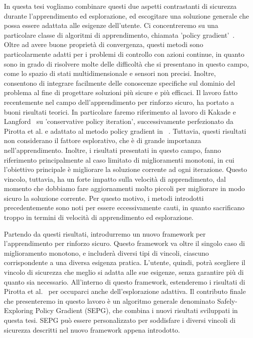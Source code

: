 In questa tesi vogliamo combinare questi due aspetti contrastanti di sicurezza durante l'apprendimento ed esplorazione, ed escogitare una soluzione generale che possa essere adattata alle esigenze dell'utente. Ci concentreremo su una particolare classe di algoritmi di apprendimento, chiamata 'policy gradient'~\cite{peters}. Oltre ad avere buone proprietà di convergenza, questi metodi sono particolarmente adatti per i problemi di controllo con azioni continue, in quanto sono in grado di risolvere molte delle difficoltà che si presentano in questo campo, come lo spazio di stati multidimensionale e sensori non precisi. Inoltre, consentono di integrare facilmente delle conoscenze specifiche sul dominio del problema al fine di progettare soluzioni più sicure e più efficaci. Il lavoro fatto recentemente nel campo dell'apprendimento per rinforzo sicuro, ha portato a buoni risultati teorici. In particolare faremo riferimento al lavoro di Kakade e Langford~\cite{Kakade02approximatelyoptimal} su 'conservative policy iteration', successivamente perfezionato da Pirotta et al. \cite{safe_iteration} e adattato al metodo policy gradient in ~\cite{adaptive_step}. Tuttavia, questi risultati non considerano il fattore esplorativo, che è di grande importanza nell'apprendimento. Inoltre, i risultati presentati in questo campo, fanno riferimento principalmente al caso limitato di miglioramenti monotoni, in cui l'obiettivo principale è migliorare la soluzione corrente ad ogni iterazione. Questo vincolo, tuttavia, ha un forte impatto sulla velocità di apprendimento, dal momento che dobbiamo fare aggiornamenti molto piccoli per migliorare in modo sicuro la soluzione corrente. Per questo motivo, i metodi introdotti precedentemente sono noti per essere eccessivamente cauti, in quanto sacrificano troppo in termini di velocità di apprendimento ed esplorazione.

Partendo da questi risultati, introdurremo un nuovo framework per l'apprendimento per rinforzo sicuro. Questo framework va oltre il singolo caso di miglioramento monotono, e includerà diversi tipi di vincoli, ciascuno corrispondente a una diversa esigenza pratica. L'utente, quindi, potrà scegliere il vincolo di sicurezza che meglio si adatta alle sue esigenze, senza garantire più di quanto sia necessario. All'interno di questo framework, estenderemo i risultati di Pirotta et al.~\cite{adaptive_step} per occuparci anche dell'esplorazione adattiva. Il contributo finale che presenteremo in questo lavoro è un algoritmo generale denominato Safely-Exploring Policy Gradient (SEPG), che combina i nuovi risultati sviluppati in questa tesi. SEPG può essere personalizzato per soddisfare i diversi vincoli di sicurezza descritti nel nuovo framework appena introdotto.